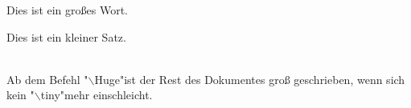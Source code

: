 \documentclass{article}
\begin{document}
Dies ist ein {\Huge großes} Wort.\\
\begin{scriptsize}Dies ist ein kleiner Satz.\end{scriptsize}\\
Ab dem Befehl "$\backslash$Huge"\Huge ist der Rest des Dokumentes groß geschrieben,
 wenn sich kein "$\backslash$tiny"\tiny mehr einschleicht.
\end{document}

